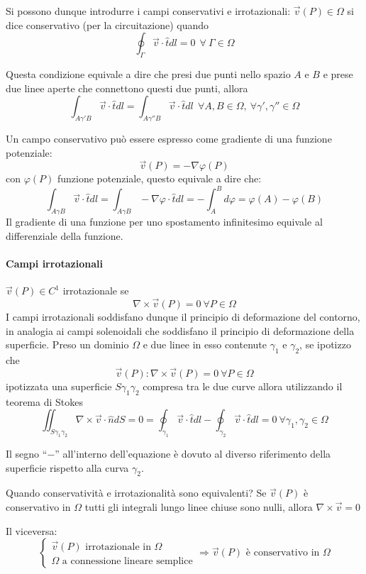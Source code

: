 Si possono dunque introdurre i campi conservativi e irrotazionali:
$\vec{v}(P) \in \Omega$ si dice conservativo (per la circuitazione) quando
$$
\oint_\Gamma \vec{v}\cdot\hat{t} dl = 0\ \ \forall\ \Gamma \in \Omega
$$

Questa condizione equivale a dire che presi due punti nello spazio $A$ e $B$ e prese due linee aperte che connettono questi due punti, allora
$$
\int_{A\gamma'B} \vec{v}\cdot\hat{t}dl = \int_{A\gamma''B} \vec{v}\cdot\hat{t}dl\ \ \forall A,B\in\Omega,\ \forall \gamma',\gamma'' \in \Omega
$$

Un campo conservativo può essere espresso come gradiente di una funzione potenziale:
$$
\vec{v}(P) = -\nabla\varphi(P)
$$
con $\varphi(P)$ funzione potenziale, questo equivale a dire che:
$$
\int_{A\gamma B} \vec{v}\cdot \hat{t} dl = \int_{A\gamma B} -\nabla\varphi\cdot\hat{t} dl =
-\int_{A}^B d\varphi = \varphi(A) - \varphi(B)
$$
Il gradiente di una funzione per uno spostamento infinitesimo equivale al differenziale della funzione.

\paragraph{Campi irrotazionali}
$\vec{v}(P) \in C^1$ irrotazionale se 
$$
\nabla\times \vec{v}(P) = 0\  \forall P \in \Omega
$$
I campi irrotazionali soddisfano dunque il principio di deformazione del contorno, in analogia
ai campi solenoidali che soddisfano il principio di deformazione della superficie.
Preso un dominio $\Omega$ e due linee in esso contenute $\gamma_1$ e $\gamma_2$,
se ipotizzo che 
$$
\vec{v}(P) : \nabla\times\vec{v}(P) =0\ \forall P \in \Omega
$$
ipotizzata una superficie $S\gamma_1\gamma_2$ compresa tra le due curve allora utilizzando
il teorema di Stokes
$$
\iint_{S\gamma_1\gamma_2} \nabla\times\vec{v}\cdot\hat{n}dS = 0 = \oint_{\gamma_1} \vec{v}\cdot\hat{t} dl - \oint_{\gamma_2} \vec{v}\cdot\hat{t}dl = 0\ \forall\gamma_1,\gamma_2\in \Omega
$$

Il segno ``$-$'' all'interno dell'equazione è dovuto al diverso riferimento della superficie rispetto alla
curva $\gamma_2$.

Quando conservatività e irrotazionalità sono equivalenti?
Se $\vec{v}(P)$ è conservativo in $\Omega $ tutti gli integrali lungo linee chiuse sono nulli, 
allora $\nabla\times\vec{v}=0$

Il viceversa:
$$
\begin{cases}
\vec{v}(P) \text{ irrotazionale in }\Omega \\
\Omega \text{ a connessione lineare semplice}
\end{cases}
\Rightarrow \vec{v}(P) \text{ è conservativo in }\Omega
$$

